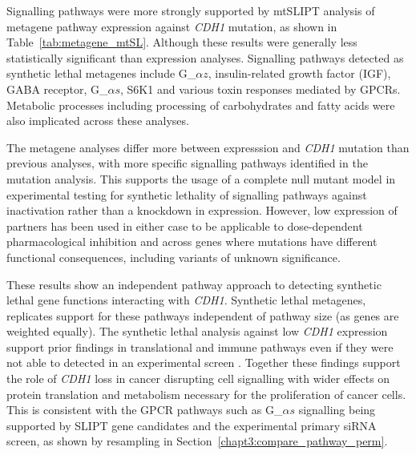 Signalling pathways were more strongly supported by mtSLIPT analysis of metagene pathway expression against \textit{CDH1} mutation, as shown in Table~\ref{tab:metagene_mtSL}. Although these results were generally less statistically significant than expression analyses. Signalling pathways detected as synthetic lethal metagenes include G_${\alpha z}$, insulin-related growth factor (IGF), GABA receptor, G_${\alpha s}$, S6K1 and various toxin responses mediated by GPCRs. Metabolic processes including processing of carbohydrates and fatty acids were also implicated across these analyses.

The metagene analyses differ more between expresssion and \textit{CDH1} mutation than previous analyses, with more specific signalling pathways identified in the mutation analysis. This supports the usage of a complete null mutant model in experimental testing for synthetic lethality of signalling pathways against  inactivation rather than a knockdown in expression. However, low expression of partners has been used in either case to be applicable to dose-dependent pharmacological inhibition and across genes where mutations have different functional consequences, including variants of unknown significance. 

These results show an independent pathway approach to detecting synthetic lethal gene functions interacting with \textit{CDH1}. Synthetic lethal metagenes, replicates support for these pathways independent of pathway size (as genes are weighted equally). The synthetic lethal analysis against low \textit{CDH1} expression support prior findings in translational and immune pathways even if they were not able to detected in an experimental screen \citep{Telford2015}. Together these findings support the role of \textit{CDH1} loss in cancer disrupting cell signalling with wider effects on protein translation and metabolism necessary for the proliferation of cancer cells. This is consistent with the GPCR pathways such as G_${\alpha s}$ signalling being supported by \gls{SLIPT} gene candidates and the experimental primary siRNA screen, as shown by resampling in Section~\ref{chapt3:compare_pathway_perm}.


\FloatBarrier


